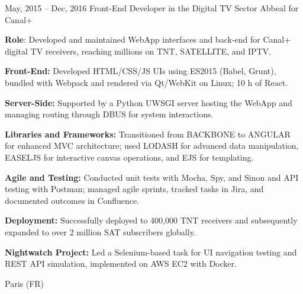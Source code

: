 \documentclass[
  a4paper,
   maincolor=cvblue,
   sectioncolor=cvblue,
   sidebarwidth=0.323\paperwidth,
]{fortysecondscv}
\begin{document}
\begin{cvtableNew}
  \cvitemRightNew
    {May, 2015 – Dec, 2016} %
    {Front-End Developer in the Digital TV Sector} %
    {Abbeal for Canal+} %
    {
      \vspace{-0.4pt} %
      \fontsize{10.8pt}{12pt}\selectfont %
      \textbf{Role}: Developed and maintained WebApp interfaces and back-end for Canal+ digital TV receivers, reaching millions on TNT, SATELLITE, and IPTV.\par
      \vspace{4pt}
      \textbf{Front-End:} Developed HTML/CSS/JS UIs using ES2015 (Babel, Grunt), bundled with Webpack and rendered via Qt/WebKit on Linux; 10 h of React.\par
      \vspace{4pt}
      \textbf{Server-Side:} Supported by a Python UWSGI server hosting the WebApp and managing routing through DBUS for system interactions.\par
      \vspace{4pt}
      \textbf{Libraries and Frameworks:} Transitioned from BACKBONE to ANGULAR for enhanced MVC architecture; used LODASH for advanced data manipulation, EASELJS for interactive canvas operations, and EJS for templating.\par
      \vspace{4pt}
      \textbf{Agile and Testing:} Conducted unit tests with Mocha, Spy, and Sinon and API testing with Postman; managed agile sprints, tracked tasks in Jira, and documented outcomes in Confluence.\par
      \vspace{4pt}
      \textbf{Deployment:} Successfully deployed to 400,000 TNT receivers and subsequently expanded to over 2 million SAT subscribers globally.\par
      \vspace{4pt}
      \textbf{Nightwatch Project:} Led a Selenium-based task for UI navigation testing and REST API simulation, implemented on AWS EC2 with Docker.\par
      \vspace{4pt} %
    }
    {Paris (FR)} %


    \vspace{1.18mm} %


\end{cvtableNew}
\end{document}
